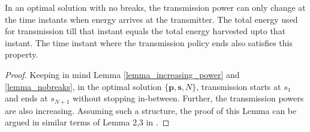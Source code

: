 %
%

\begin{lemma}
In an optimal solution with no breaks, the transmission power can only change at the time instants when energy arrives at the transmitter. The total energy used for transmission till that instant equals the total energy harvested upto that instant. The time instant where the transmission policy ends also satisfies this property.
\label{lemma_energy_consumed} 
\end{lemma}
\begin{proof}
Keeping in mind Lemma \ref{lemma_increasing_power} and \ref{lemma_nobreaks}, in the optimal solution $\{\bm{p}, \bm{s}, N\}$, transmission starts at $s_1$ and ends at $s_{N+1}$ without stopping in-between. Further, the transmission powers are also increasing. Assuming such a structure, the proof of this Lemma can be argued in similar terms of Lemma 2,3 in \cite{Yang}. 
\end{proof}	

